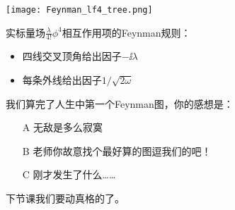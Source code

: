 \documentclass[CJK]{beamer}
\begin{document}
\begin{frame} 
\bch
\begin{minipage}{0.45\textwidth}
\texttt{[image: Feynman\_lf4\_tree.png]}
\end{minipage}
\begin{minipage}{0.45\textwidth}
实标量场$\frac{\lambda}{4!}\phi^4$相互作用项的Feynman规则：
\begin{itemize}
\item{四线交叉顶角给出因子$-\ii\lambda$}
\item{每条外线给出因子$1/\sqrt{2\omega}$}
\end{itemize}
\end{minipage}

\ech
\end{frame}

\begin{frame}
\bch
我们算完了人生中第一个Feynman图，你的感想是：
\begin{itemize}
\item[A]{无敌是多么寂寞}
\item[B]{老师你故意找个最好算的图逗我们的吧！}
\item[C]{刚才发生了什么……}
\end{itemize}
\ech
\end{frame}

\begin{frame}
\bch

下节课我们要动真格的了。
\ech
\end{frame}
\end{document}
